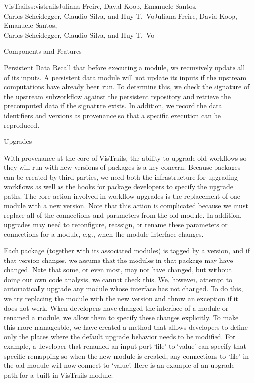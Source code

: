 \begin{aosachaptertoc}{VisTrails}{s:vistrails}{Juliana Freire, David Koop, Emanuele Santos, \\ Carlos Scheidegger, Claudio Silva, and Huy T.\ Vo}{Juliana Freire, David Koop, Emanuele Santos, \\ \hspace*{0.9cm} Carlos Scheidegger, Claudio Silva, and Huy T.\ Vo}
\begin{aosasect1}{Components and Features}
\begin{aosasect2}{Persistent Data}
Recall that before executing a module, we recursively update all of
its inputs.  A persistent data module will not update its inputs if
the upstream computations have already been run.  To determine this,
we check the signature of the upstream subworkflow against the
persistent repository and retrieve the precomputed data if the
signature exists.  In addition, we record the data identifiers and
versions as provenance so that a specific execution can be reproduced.

\end{aosasect2}

\begin{aosasect2}{Upgrades}
\label{sec.vistrails.upgrades}

With provenance at the core of VisTrails, the ability to upgrade old
workflows so they will run with new versions of packages is a key
concern.  Because packages can be created by third-parties, we need
both the infrastructure for upgrading workflows as well as the hooks
for package developers to specify the upgrade paths.  The core action
involved in workflow upgrades is the replacement of one module with a
new version.  Note that this action is complicated because we must
replace all of the connections and parameters from the old module.  In
addition, upgrades may need to reconfigure, reassign, or rename these
parameters or connections for a module, e.g., when the module
interface changes.

Each package (together with its associated modules) is tagged by a
version, and if that version changes, we assume that the modules in
that package may have changed.  Note that some, or even most, may not
have changed, but without doing our own code analysis, we cannot check
this.  We, however, attempt to automatically upgrade any module
whose interface has not changed.  To do this, we try replacing the
module with the new version and throw an exception if it does not
work.  When developers have changed the interface of a module or
renamed a module, we allow them to specify these changes explicitly.
To make this more manageable, we have created a 
method that allows developers to define only the places where the
default upgrade behavior needs to be modified.  For example, a
developer that renamed an input port `file' to `value' can specify
that specific remapping so when the new module is created, any
connections to `file' in the old module will now connect to
`value'. Here is an example of an upgrade path for a built-in
VisTrails module:


\end{aosasect2}
\end{aosasect1}
\end{aosachaptertoc}
